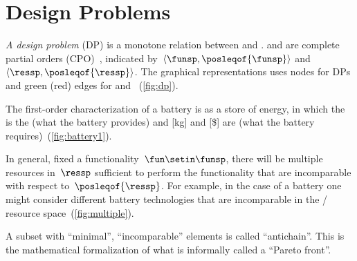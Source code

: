 \section{Design Problems}

\emph{A design problem} (DP) is a monotone relation between \emph{}
and \emph{}.  and 
are complete partial orders (CPO)~\cite{davey02}, indicated by~$\langle\funsp,\posleqof{\funsp}\rangle$
and~$\langle\ressp,\posleqof{\ressp}\rangle$.
The graphical representations
uses nodes for DPs and green (red) edges for  and
~(\cref{fig:dp}).

\begin{example}
    The first-order characterization of a battery is as a store of energy,
    in which the  is the  (what
    the battery provides) and  {[}kg{]} and  {[}\${]}
    are  (what the battery requires)~(\cref{fig:battery1}).
\end{example}

\noindent In general, fixed a functionality~$\fun\setin\funsp$, there
will be multiple resources in~$\ressp$ sufficient to perform the
functionality that are incomparable with respect to~$\posleqof{\ressp}$.
For example, in the case of a battery one might consider different
battery technologies that are incomparable in the /
resource space~(\cref{fig:multiple}).


A subset with ``minimal'', ``incomparable'' elements is called
``antichain''.
This is the mathematical formalization of what is
informally called a ``Pareto front''.

